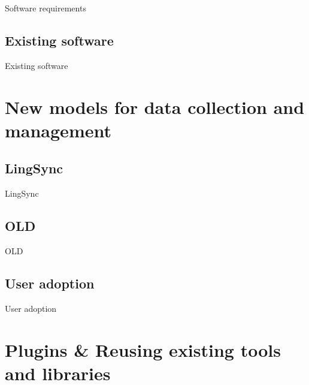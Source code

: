 \documentclass{beamer}
\begin{document}
\begin{frame}
Software requirements
\end{frame}


\subsection{Existing software}

\begin{frame}
Existing software
\end{frame}


\section[LingSync/OLD]{New models for data collection and management}
\subsection{LingSync}\label{sec:lingsync}

\begin{frame}
LingSync
\end{frame}

\subsection{OLD}\label{sec:old}

\begin{frame}
OLD
\end{frame}


\subsection{User adoption}

\begin{frame}
User adoption
\end{frame}


%


\section[Plugins]{Plugins \& Reusing existing tools and libraries}
\end{document}
